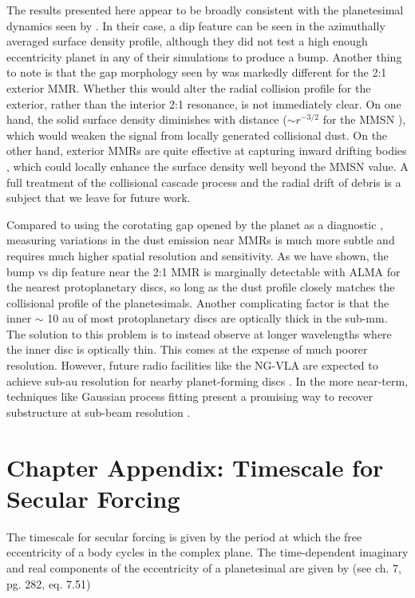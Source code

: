 The results presented here appear to be broadly consistent with the planetesimal dynamics seen by \cite{tabeshian16}. In their 
case, a dip feature can be seen in the azimuthally averaged surface density profile, although they did not test a high enough 
eccentricity planet in any of their simulations to produce a bump. Another thing to note is that the gap morphology seen by 
\cite{tabeshian16} was markedly different for the 2:1 exterior MMR. Whether this would alter the radial collision profile for the 
exterior, rather than the interior 2:1 resonance, is not immediately clear.  On one hand, the solid surface density diminishes with 
distance ($\sim r^{-3/2}$ for the MMSN \cite{hayashi81}), which would weaken the signal from locally generated collisional dust. 
On the other hand, exterior MMRs are quite effective at capturing inward drifting bodies \cite{weidenschilling85}, which could 
locally enhance the surface density well beyond the MMSN value. A full treatment of the collisional cascade process and the 
radial drift of debris is a subject that we leave for future work.

Compared to using the corotating gap opened by the planet as a diagnostic \cite{dobinson13, dobinson16}, measuring variations 
in the dust emission near MMRs is much more subtle and requires much higher spatial resolution and sensitivity. As we have 
shown, the bump vs dip feature near the 2:1 MMR is marginally detectable with ALMA for the nearest protoplanetary discs, so 
long as the dust profile closely matches the collisional profile of the planetesimals. Another complicating factor is that the inner $
\sim$ 10 au of most protoplanetary discs are optically thick in the sub-mm. The solution to this problem is to instead observe at 
longer wavelengths where the inner disc is optically thin. This comes at the expense of much poorer resolution. However, future 
radio facilities like the NG-VLA are expected to achieve sub-au resolution for nearby planet-forming discs \cite{ricci20}. In the 
more near-term, techniques like Gaussian process fitting present a promising way to recover substructure at sub-beam 
resolution \cite{jennings20}.

\section{Chapter Appendix: Timescale for Secular Forcing}\label{sec:sec_forcing_timescale}

The timescale for secular forcing is given by the period at which the free eccentricity of a body cycles in the complex plane. The 
time-dependent imaginary and real components of the eccentricity of a planetesimal are given by \cite{murray99} (see ch. 7, pg. 
282, eq. 7.51)

